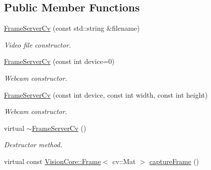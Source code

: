 \subsection*{Public Member Functions}
\begin{DoxyCompactItemize}
\item 
\hypertarget{class_viscv_1_1_frame_server_cv_afbbe5b7deab45c4b15f84bdf0cc2d45c}{}\hyperlink{class_viscv_1_1_frame_server_cv_afbbe5b7deab45c4b15f84bdf0cc2d45c}{Frame\+Server\+Cv} (const std\+::string \&filename)\label{class_viscv_1_1_frame_server_cv_afbbe5b7deab45c4b15f84bdf0cc2d45c}

\begin{DoxyCompactList}\small\item\em Video file constructor. \end{DoxyCompactList}\item 
\hypertarget{class_viscv_1_1_frame_server_cv_afa10dfc0f660da596e10eedd689382bd}{}\hyperlink{class_viscv_1_1_frame_server_cv_afa10dfc0f660da596e10eedd689382bd}{Frame\+Server\+Cv} (const int device=0)\label{class_viscv_1_1_frame_server_cv_afa10dfc0f660da596e10eedd689382bd}

\begin{DoxyCompactList}\small\item\em Webcam constructor. \end{DoxyCompactList}\item 
\hypertarget{class_viscv_1_1_frame_server_cv_a854cb9a501a11f2c27c5c35a9583d91b}{}\hyperlink{class_viscv_1_1_frame_server_cv_a854cb9a501a11f2c27c5c35a9583d91b}{Frame\+Server\+Cv} (const int device, const int width, const int height)\label{class_viscv_1_1_frame_server_cv_a854cb9a501a11f2c27c5c35a9583d91b}

\begin{DoxyCompactList}\small\item\em Webcam constructor. \end{DoxyCompactList}\item 
\hypertarget{class_viscv_1_1_frame_server_cv_aabc865ffb5b6f99eb517bee2d1a4ac18}{}virtual \hyperlink{class_viscv_1_1_frame_server_cv_aabc865ffb5b6f99eb517bee2d1a4ac18}{$\sim$\+Frame\+Server\+Cv} ()\label{class_viscv_1_1_frame_server_cv_aabc865ffb5b6f99eb517bee2d1a4ac18}

\begin{DoxyCompactList}\small\item\em Destructor method. \end{DoxyCompactList}\item 
\hypertarget{class_viscv_1_1_frame_server_cv_a9ad5d34c4a7364130b2da00adc8f8638}{}virtual const \hyperlink{struct_vision_core_1_1_data_structures_1_1_frame}{Vision\+Core\+::\+Frame}$<$ cv\+::\+Mat $>$ \hyperlink{class_viscv_1_1_frame_server_cv_a9ad5d34c4a7364130b2da00adc8f8638}{capture\+Frame} ()\label{class_viscv_1_1_frame_server_cv_a9ad5d34c4a7364130b2da00adc8f8638}


\end{DoxyCompactItemize}
